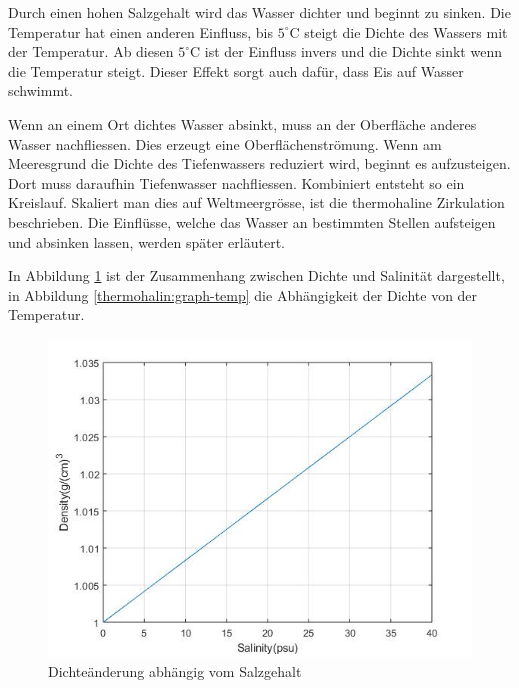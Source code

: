 Durch einen hohen Salzgehalt wird das Wasser dichter und beginnt zu sinken. Die Temperatur hat einen anderen Einfluss, bis $5^\circ\text{C}$ steigt die Dichte des Wassers mit der Temperatur. Ab diesen $5^\circ\text{C}$ ist der Einfluss invers und die Dichte sinkt wenn die Temperatur steigt. Dieser Effekt sorgt auch dafür, dass Eis auf Wasser schwimmt.

Wenn an einem Ort dichtes Wasser absinkt, muss an der Oberfläche anderes Wasser nachfliessen. Dies erzeugt eine Oberflächenströmung. Wenn am Meeresgrund die Dichte des Tiefenwassers reduziert wird, beginnt es aufzusteigen. Dort muss daraufhin Tiefenwasser nachfliessen. Kombiniert entsteht so ein Kreislauf. Skaliert man dies auf Weltmeergrösse, ist die thermohaline Zirkulation beschrieben. Die Einflüsse, welche das Wasser an bestimmten Stellen aufsteigen und absinken lassen, werden später erläutert.

In Abbildung \ref{thermohalin:graph-salinity} ist der Zusammenhang zwischen Dichte und Salinität dargestellt, in Abbildung \ref{thermohalin:graph-temp} die Abhängigkeit der Dichte von der Temperatur.


\begin{figure}
	\centering
\includegraphics[width=12cm]{thermohalin/Code/graphs/graph_salinity.jpg}
\caption{Dichteänderung abhängig vom Salzgehalt\label{thermohalin:graph-salinity}}
\end{figure}

